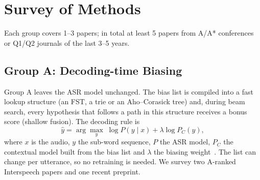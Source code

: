 \section{Survey of Methods}\label{sec:survey}

Each group covers 1--3 papers; in total at least 5 papers from A/A* conferences or Q1/Q2
journals of the last 3--5 years.

\newcommand{\paperbox}[8]{%
  \subsubsection{#1}
  \begin{description}[leftmargin=0pt,style=nextline]
    \item[Reference] #2
    \item[Main idea] #3
    \item[Architecture / method] #4
    \item[Data and key results] #5
    \item[Strengths] #6
    \item[Weaknesses / limitations] #7
    \item[Relevance to this project] #8
  \end{description}
}

\subsection{Group A: Decoding-time Biasing}
Group A leaves the ASR model unchanged. The bias list is compiled into a fast lookup structure
(an FST, a trie or an Aho--Corasick tree) and, during beam search, every hypothesis that follows a path in this
structure receives a bonus score (shallow fusion). The decoding rule is
\begin{equation}\label{eq:sf}
  \hat{y} = \arg\max_{y}\; \log P(y\mid x) + \lambda \log P_C(y),
\end{equation}
where $x$ is the audio, $y$ the sub-word sequence, $P$ the ASR model, $P_C$ the contextual model built from the bias list
and $\lambda$ the biasing weight~\cite{zhao2019}. The list can change per utterance, so no retraining is needed.
We survey two A-ranked Interspeech papers and one recent preprint.


